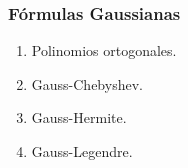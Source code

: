 \documentclass[12pt]{beamer}
\begin{document}
\begin{frame}
\frametitle{Fórmulas Gaussianas}
\begin{enumerate}[<+->]
\item Polinomios ortogonales.
\item Gauss-Chebyshev.
\item Gauss-Hermite.
\item Gauss-Legendre.
\end{enumerate}
\end{frame}
\end{document}
